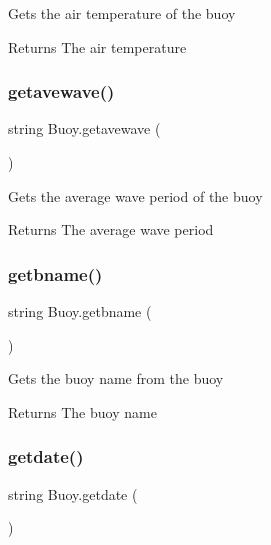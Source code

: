 Gets the air temperature of the buoy \begin{DoxyReturn}{Returns}
The air temperature 
\end{DoxyReturn}
\mbox{\label{class_buoy_a585117182ea30d68098d5b5c0dc7f78c}} 
\subsubsection{\texorpdfstring{getavewave()}{getavewave()}}
{\footnotesize\ttfamily string Buoy.\+getavewave (\begin{DoxyParamCaption}{ }\end{DoxyParamCaption})\hspace{0.3cm}{\ttfamily [inline]}}

Gets the average wave period of the buoy \begin{DoxyReturn}{Returns}
The average wave period 
\end{DoxyReturn}
\mbox{\label{class_buoy_a70a9f0c2ed761cb6652de7f5b4d51e8c}} 
\subsubsection{\texorpdfstring{getbname()}{getbname()}}
{\footnotesize\ttfamily string Buoy.\+getbname (\begin{DoxyParamCaption}{ }\end{DoxyParamCaption})\hspace{0.3cm}{\ttfamily [inline]}}

Gets the buoy name from the buoy \begin{DoxyReturn}{Returns}
The buoy name 
\end{DoxyReturn}
\mbox{\label{class_buoy_add4f34cc5cf9d4f76e0bef759dddf718}} 
\subsubsection{\texorpdfstring{getdate()}{getdate()}}
{\footnotesize\ttfamily string Buoy.\+getdate (\begin{DoxyParamCaption}{ }\end{DoxyParamCaption})\hspace{0.3cm}{\ttfamily [inline]}}

